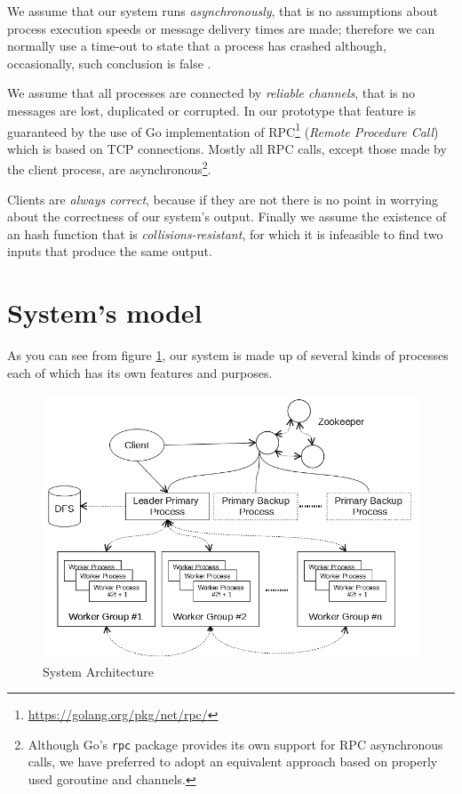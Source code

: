 \documentclass[sigchi]{acmart}
\begin{document}
We assume that our system runs \textit{asynchronously}, that is no assumptions about process execution speeds or message delivery times are made; therefore we can normally use a time-out to state that a process has crashed although, occasionally, such conclusion is false \cite{SDCC}.

We assume that all processes are connected by \textit{reliable channels}, that is no messages are lost, duplicated or corrupted. In our prototype that feature is guaranteed  by the use of Go implementation of RPC\footnote{\url{https://golang.org/pkg/net/rpc/}} (\textit{Remote Procedure Call}) which is based on TCP connections. Mostly all RPC calls, except those made by the client process, are asynchronous\footnote{Although Go's \texttt{rpc} package provides its own support for RPC asynchronous calls, we have  preferred to adopt an equivalent approach based on properly used goroutine and channels.}.

Clients are \textit{always correct}, because if they are not there is no point in worrying about the correctness of our system's output. Finally we assume the existence of an hash function that is \textit{collisions-resistant}, for which it is infeasible to find two inputs that produce the same output.

\section{System's model}

As you can see from figure \ref{fig:model}, our system is made up of several kinds of processes each of which has its own features and purposes.

\begin{figure}[h]
  \centering
  \includegraphics[width=\linewidth]{Architecture.png}
  \caption{System Architecture}
  \label{fig:model}
\end{figure}
\end{document}
